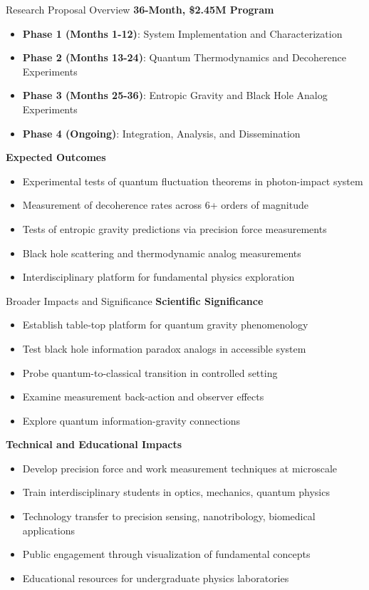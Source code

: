 \documentclass{beamer}
\begin{document}
\begin{frame}{Research Proposal Overview}
\textbf{36-Month, \$2.45M Program}
\begin{itemize}
\item \textbf{Phase 1 (Months 1-12)}: System Implementation and Characterization
\item \textbf{Phase 2 (Months 13-24)}: Quantum Thermodynamics and Decoherence Experiments
\item \textbf{Phase 3 (Months 25-36)}: Entropic Gravity and Black Hole Analog Experiments
\item \textbf{Phase 4 (Ongoing)}: Integration, Analysis, and Dissemination
\end{itemize}

\textbf{Expected Outcomes}
\begin{itemize}
\item Experimental tests of quantum fluctuation theorems in photon-impact system
\item Measurement of decoherence rates across 6+ orders of magnitude
\item Tests of entropic gravity predictions via precision force measurements
\item Black hole scattering and thermodynamic analog measurements
\item Interdisciplinary platform for fundamental physics exploration
\end{itemize}
\end{frame}

\begin{frame}{Broader Impacts and Significance}
\textbf{Scientific Significance}
\begin{itemize}
\item Establish table-top platform for quantum gravity phenomenology
\item Test black hole information paradox analogs in accessible system
\item Probe quantum-to-classical transition in controlled setting
\item Examine measurement back-action and observer effects
\item Explore quantum information-gravity connections
\end{itemize}

\textbf{Technical and Educational Impacts}
\begin{itemize}
\item Develop precision force and work measurement techniques at microscale
\item Train interdisciplinary students in optics, mechanics, quantum physics
\item Technology transfer to precision sensing, nanotribology, biomedical applications
\item Public engagement through visualization of fundamental concepts
\item Educational resources for undergraduate physics laboratories
\end{itemize}
\end{frame}
\end{document}
